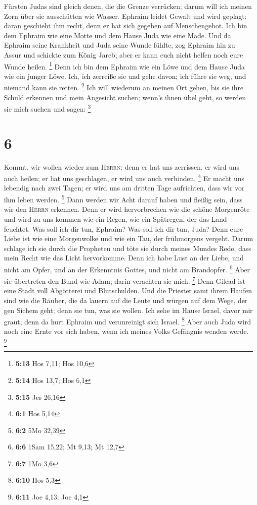 Fürsten Judas sind gleich denen, die die Grenze verrücken; darum will
ich meinen Zorn über sie ausschütten wie Wasser.  Ephraim
leidet Gewalt und wird geplagt; daran geschieht ihm recht, denn er hat
sich gegeben auf Menschengebot.  Ich bin dem Ephraim wie
eine Motte und dem Hause Juda wie eine Made.  Und da
Ephraim seine Krankheit und Juda seine Wunde fühlte, zog Ephraim hin zu
Assur und schickte zum König Jareb; aber er kann euch nicht helfen noch
eure Wunde heilen. \footnote{\textbf{5:13} Hos 7,11; Hos 10,6}
 Denn ich bin dem Ephraim wie ein Löwe und dem Hause Juda
wie ein junger Löwe. Ich, ich zerreiße sie und gehe davon; ich führe sie
weg, und niemand kann sie retten. \footnote{\textbf{5:14} Hos 13,7; Hos
  6,1}  Ich will wiederum an meinen Ort gehen, bis sie
ihre Schuld erkennen und mein Angesicht suchen; wenn's ihnen übel geht,
so werden sie mich suchen und sagen: \footnote{\textbf{5:15} Jes 26,16}

\hypertarget{section-2}{%
\section{6}\label{section-2}}

 Kommt, wir wollen wieder zum \textsc{Herrn}; denn er hat
uns zerrissen, er wird uns auch heilen; er hat uns geschlagen, er wird
uns auch verbinden. \footnote{\textbf{6:1} Hos 5,14}  Er
macht uns lebendig nach zwei Tagen; er wird uns am dritten Tage
aufrichten, dass wir vor ihm leben werden. \footnote{\textbf{6:2} 5Mo
  32,39}  Dann werden wir Acht darauf haben und fleißig
sein, dass wir den \textsc{Herrn} erkennen. Denn er wird hervorbrechen
wie die schöne Morgenröte und wird zu uns kommen wie ein Regen, wie ein
Spätregen, der das Land feuchtet.  Was soll ich dir tun,
Ephraim? Was soll ich dir tun, Juda? Denn eure Liebe ist wie eine
Morgenwolke und wie ein Tau, der frühmorgens vergeht. 
Darum schlage ich sie durch die Propheten und töte sie durch meines
Mundes Rede, dass mein Recht wie das Licht hervorkomme. 
Denn ich habe Lust an der Liebe, und nicht am Opfer, und an der
Erkenntnis Gottes, und nicht am Brandopfer. \footnote{\textbf{6:6} 1Sam
  15,22; Mt 9,13; Mt 12,7}  Aber sie übertreten den Bund
wie Adam; darin verachten sie mich. \footnote{\textbf{6:7} 1Mo 3,6}
 Denn Gilead ist eine Stadt voll Abgötterei und
Blutschulden.  Und die Priester samt ihrem Haufen sind wie
die Räuber, die da lauern auf die Leute und würgen auf dem Wege, der gen
Sichem geht; denn sie tun, was sie wollen.  Ich sehe im
Hause Israel, davor mir graut; denn da hurt Ephraim und verunreinigt
sich Israel. \footnote{\textbf{6:10} Hos 5,3}  Aber auch
Juda wird noch eine Ernte vor sich haben, wenn ich meines Volks
Gefängnis wenden werde. \footnote{\textbf{6:11} Joe 4,13; Joe 4,1}

